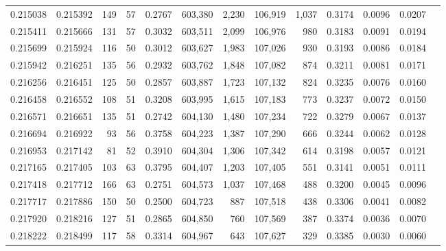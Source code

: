 \begin{tabular}{rrrrrrrrrrrrr}
0.215038 & 0.215392 &   149 &  57 &                                     0.2767 & 603,380 &   2,230 & 106,919 &   1,037 & 0.3174 & 0.0096 & 0.0207 \\
0.215411 & 0.215666 &   131 &  57 &                                     0.3032 & 603,511 &   2,099 & 106,976 &     980 & 0.3183 & 0.0091 & 0.0194 \\
0.215699 & 0.215924 &   116 &  50 &                                     0.3012 & 603,627 &   1,983 & 107,026 &     930 & 0.3193 & 0.0086 & 0.0184 \\
0.215942 & 0.216251 &   135 &  56 &                                     0.2932 & 603,762 &   1,848 & 107,082 &     874 & 0.3211 & 0.0081 & 0.0171 \\
0.216256 & 0.216451 &   125 &  50 &                                     0.2857 & 603,887 &   1,723 & 107,132 &     824 & 0.3235 & 0.0076 & 0.0160 \\
0.216458 & 0.216552 &   108 &  51 &                                     0.3208 & 603,995 &   1,615 & 107,183 &     773 & 0.3237 & 0.0072 & 0.0150 \\
0.216571 & 0.216651 &   135 &  51 &                                     0.2742 & 604,130 &   1,480 & 107,234 &     722 & 0.3279 & 0.0067 & 0.0137 \\
0.216694 & 0.216922 &    93 &  56 &                                     0.3758 & 604,223 &   1,387 & 107,290 &     666 & 0.3244 & 0.0062 & 0.0128 \\
0.216953 & 0.217142 &    81 &  52 &                                     0.3910 & 604,304 &   1,306 & 107,342 &     614 & 0.3198 & 0.0057 & 0.0121 \\
0.217165 & 0.217405 &   103 &  63 &                                     0.3795 & 604,407 &   1,203 & 107,405 &     551 & 0.3141 & 0.0051 & 0.0111 \\
0.217418 & 0.217712 &   166 &  63 &                                     0.2751 & 604,573 &   1,037 & 107,468 &     488 & 0.3200 & 0.0045 & 0.0096 \\
0.217717 & 0.217886 &   150 &  50 &                                     0.2500 & 604,723 &     887 & 107,518 &     438 & 0.3306 & 0.0041 & 0.0082 \\
0.217920 & 0.218216 &   127 &  51 &                                     0.2865 & 604,850 &     760 & 107,569 &     387 & 0.3374 & 0.0036 & 0.0070 \\
0.218222 & 0.218499 &   117 &  58 &                                     0.3314 & 604,967 &     643 & 107,627 &     329 & 0.3385 & 0.0030 & 0.0060 \\

\end{tabular}
